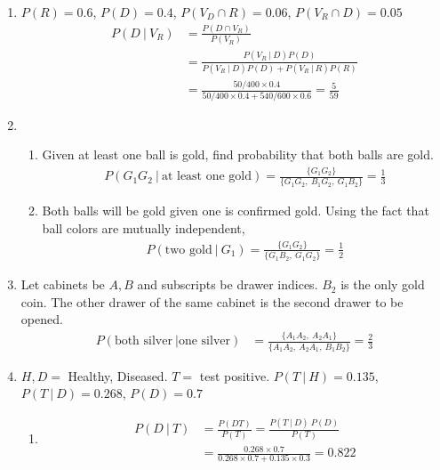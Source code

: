\begin{enumerate}
\begin{enumerate}
	\end{enumerate}
	
	\item $ P(R) = 0.6 $, $ P(D) = 0.4 $, $ P(V_D \cap R) = 0.06 $, $ P(V_R \cap D) = 0.05 $ \\
	
		\begin{align}
			P(D \ |\ V_R) &= \frac{P(D \cap V_R)}{P(V_R)} \\
			&= \frac{P(V_R \ |\ D) P(D)}{P(V_R \ |\ D) P(D) + P(V_R \ |\ R) P(R)} \\
			&= \frac{50/400 \times 0.4}{50/400 \times 0.4 + 540/600 \times 0.6} = \frac{5}{59}
		\end{align}
	
	
	\item \begin{enumerate}
		\item Given at least one ball is gold, find probability that both balls are gold.
		\begin{align}
			P(G_1 G_2 \ |\ \text{at least one gold}) = \frac{\{ G_1 G_2 \}}{\{ G_1 G_2,\ B_1 G_2,\ G_1 B_2 \}} = \frac{1}{3}
		\end{align}
		
		\item Both balls will be gold given one is confirmed gold. Using the fact that ball colors are mutually independent,
		\begin{align}
			P(\text{two gold}\ |\ G_1) = \frac{\{ G_1 G_2 \}}{\{ G_1 B_2 ,\ G_1 G_2\}} = \frac{1}{2}
		\end{align}
	\end{enumerate}
	
	\item Let cabinets be $ A, B $ and subscripts be drawer indices. $ B_2 $ is the only gold coin. The other drawer of the same cabinet is the second drawer to be opened.
	\begin{align}
		P(\text{both silver}\ | \text{one silver}) &= \frac{\{ A_1 A_2,\ A_2 A_1 \}}{\{ A_1 A_2,\ A_2 A_1,\ B_1 B_2 \}} = \frac{2}{3}
	\end{align}
	
	\item $ H, D = $ Healthy, Diseased. $ T =  $ test positive.
	$ P(T\ |\ H) = 0.135 $, $ P(T\ |\ D) = 0.268 $, $ P(D) = 0.7 $\\
	
	\begin{enumerate}
		\item \begin{align}
			P(D\ |\ T) &= \frac{P(DT)}{P(T)} = \frac{P(T\ |\ D) \ P(D)}{P(T)} \\
			&= \frac{0.268 \times 0.7}{0.268 \times 0.7 + 0.135 \times 0.3} = 0.822
		\end{align}
		

\end{enumerate}
\end{enumerate}
